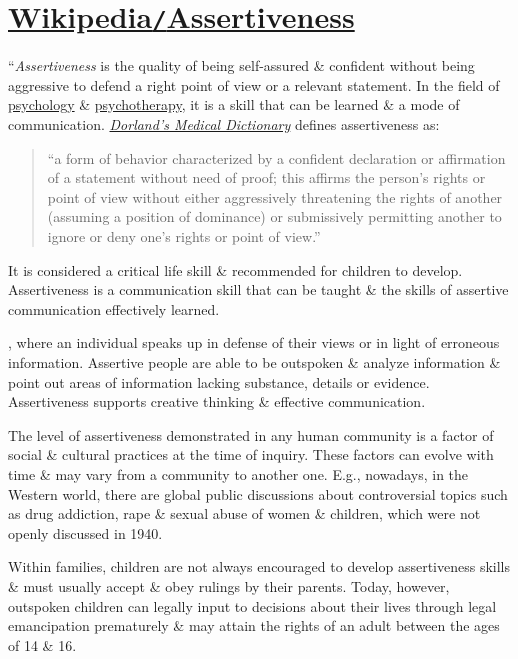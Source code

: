 \documentclass[oneside]{book}
\numberwithin{equation}{section}
\begin{document}
\section{\href{https://en.wikipedia.org/wiki/Assertiveness}{Wikipedia\texttt{/}Assertiveness}}
``\textit{Assertiveness} is the quality of being self-assured \& confident without being aggressive to defend a right point of view or a relevant statement. In the field of \href{https://en.wikipedia.org/wiki/Psychology}{psychology} \& \href{https://en.wikipedia.org/wiki/Psychotherapy}{psychotherapy}, it is a skill that can be learned \& a mode of communication. \href{https://en.wikipedia.org/wiki/Dorland%27s_Medical_Dictionary}{\textit{Dorland's Medical Dictionary}} defines assertiveness as:
\begin{quotation}
	``a form of behavior characterized by a confident declaration or affirmation of a statement without need of proof; this affirms the person's rights or point of view without either aggressively threatening the rights of another (assuming a position of dominance) or submissively permitting another to ignore or deny one's rights or point of view.''
\end{quotation}
It is considered a critical life skill \& recommended for children to develop. Assertiveness is a communication skill that can be taught \& the skills of assertive communication effectively learned.

, where an individual speaks up in defense of their views or in light of erroneous information. Assertive people are able to be outspoken \& analyze information \& point out areas of information lacking substance, details or evidence. Assertiveness supports creative thinking \& effective communication.

The level of assertiveness demonstrated in any human community is a factor of social \& cultural practices at the time of inquiry. These factors can evolve with time \& may vary from a community to another one. E.g., nowadays, in the Western world, there are global public discussions about controversial topics such as drug addiction, rape \& sexual abuse of women \& children, which were not openly discussed in 1940.

Within families, children are not always encouraged to develop assertiveness skills \& must usually accept \& obey rulings by their parents. Today, however, outspoken children can legally input to decisions about their lives through legal emancipation prematurely \& may attain the rights of an adult between the ages of 14 \& 16.
\end{document}
